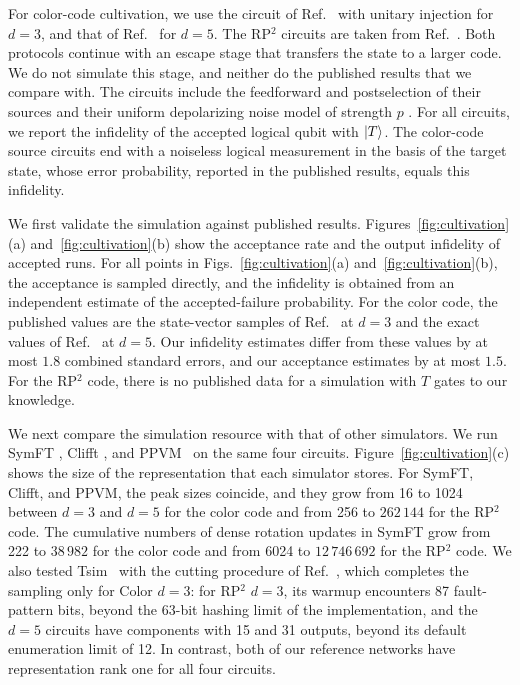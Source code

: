 \documentclass[aps,prx,twocolumn,superscriptaddress,longbibliography]{revtex4-2}
\begin{document}
For color-code cultivation,
we use the circuit of Ref.~\cite{gidneyMagicStateCultivation2024} with unitary injection for $d=3$,
and that of Ref.~\cite{wanExactLogicalError2026} for $d=5$.
The RP$^2$ circuits are taken from Ref.~\cite{chenEfficientMagicState2025}.
Both protocols continue with an escape stage that transfers the state to a larger code.
We do not simulate this stage,
and neither do the published results that we compare with.
The circuits include the feedforward and postselection of their sources
and their uniform depolarizing noise model of strength $p$ \cite{gidneyMagicStateCultivation2024}.
For all circuits, we report the infidelity of the accepted logical qubit with $\ket{T}$.
The color-code source circuits end with a noiseless logical measurement in the basis of the target state,
whose error probability, reported in the published results, equals this infidelity.

We first validate the simulation against published results.
Figures~\ref{fig:cultivation}(a) and~\ref{fig:cultivation}(b) show
the acceptance rate and the output infidelity of accepted runs.
For all points in Figs.~\ref{fig:cultivation}(a) and~\ref{fig:cultivation}(b), the acceptance is sampled directly,
and the infidelity is obtained from an independent estimate of the accepted-failure probability.
For the color code, the published values are the state-vector samples of
Ref.~\cite{gidneyMagicStateCultivation2024} at $d=3$
and the exact values of Ref.~\cite{wanExactLogicalError2026} at $d=5$.
Our infidelity estimates differ from these values by at most $1.8$ combined standard errors,
and our acceptance estimates by at most $1.5$.
For the RP$^2$ code, there is no published data for a simulation with $T$ gates to our knowledge.

We next compare the simulation resource with that of other simulators.
We run SymFT \cite{fangSymFTUniversalFaultTolerant2026}, Clifft \cite{chaseClifftFastExact2026},
and PPVM~\cite{luoPPVMCircuitSimulation2026}
on the same four circuits.
Figure~\ref{fig:cultivation}(c) shows the size of the representation that each simulator stores.
For SymFT, Clifft, and PPVM, the peak sizes coincide,
and they grow from 16 to 1024 between $d=3$ and $d=5$ for the color code
and from 256 to $262\,144$ for the RP$^2$ code.
The cumulative numbers of dense rotation updates in SymFT grow
from 222 to $38\,982$ for the color code and from 6024 to $12\,746\,692$ for the RP$^2$ code.
We also tested Tsim~\cite{haenelTsimFastUniversal2026} with the cutting procedure of Ref.~\cite{wanSimulatingMagicState2025},
which completes the sampling only for Color $d=3$:
for RP$^2$ $d=3$, its warmup encounters 87 fault-pattern bits, beyond the 63-bit hashing limit of the implementation,
and the $d=5$ circuits have components with 15 and 31 outputs, beyond its default enumeration limit of 12.
In contrast, both of our reference networks have representation rank one for all four circuits.
\end{document}
